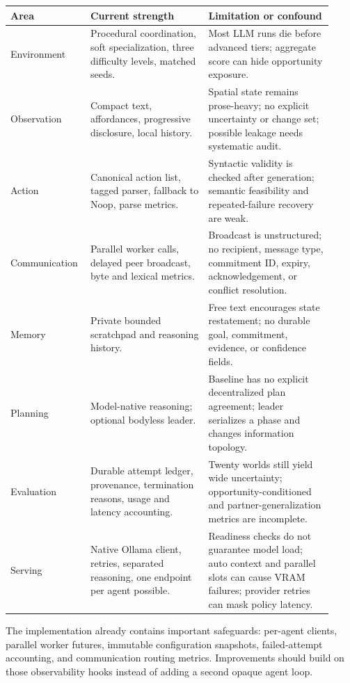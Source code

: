 \documentclass[11pt]{article}
\begin{document}
\begin{longtable}{p{0.20\linewidth}p{0.35\linewidth}p{0.37\linewidth}}
\toprule
Area & Current strength & Limitation or confound \\
\midrule
\endhead
Environment & Procedural coordination, soft specialization, three difficulty levels, matched seeds. & Most LLM runs die before advanced tiers; aggregate score can hide opportunity exposure. \\
Observation & Compact text, affordances, progressive disclosure, local history. & Spatial state remains prose-heavy; no explicit uncertainty or change set; possible leakage needs systematic audit. \\
Action & Canonical action list, tagged parser, fallback to Noop, parse metrics. & Syntactic validity is checked after generation; semantic feasibility and repeated-failure recovery are weak. \\
Communication & Parallel worker calls, delayed peer broadcast, byte and lexical metrics. & Broadcast is unstructured; no recipient, message type, commitment ID, expiry, acknowledgement, or conflict resolution. \\
Memory & Private bounded scratchpad and reasoning history. & Free text encourages state restatement; no durable goal, commitment, evidence, or confidence fields. \\
Planning & Model-native reasoning; optional bodyless leader. & Baseline has no explicit decentralized plan agreement; leader serializes a phase and changes information topology. \\
Evaluation & Durable attempt ledger, provenance, termination reasons, usage and latency accounting. & Twenty worlds still yield wide uncertainty; opportunity-conditioned and partner-generalization metrics are incomplete. \\
Serving & Native Ollama client, retries, separated reasoning, one endpoint per agent possible. & Readiness checks do not guarantee model load; auto context and parallel slots can cause VRAM failures; provider retries can mask policy latency. \\
\bottomrule
\end{longtable}

The implementation already contains important safeguards: per-agent clients, parallel worker
futures, immutable configuration snapshots, failed-attempt accounting, and communication routing
metrics.  Improvements should build on those observability hooks instead of adding a second opaque
agent loop.
\end{document}
